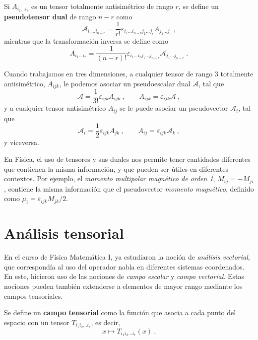 \begin{defi}
    Si $A_{i_1 \dots i_r}$ es un tensor totalmente antisimétrico de rango $r$, se define un \textbf{pseudotensor dual} de rango $n-r$ como
    \begin{equation}
        \mathcal{A}_{i_1 \dots i_{n-r}} = \frac{1}{r!} \varepsilon_{i_1 \dots i_{n-r} j_1 \dots j_r} A_{j_1 \dots j_r} \ ,
    \end{equation}
    mientras que la transformación inversa se define como
    \begin{equation}
        A_{i_1 \dots i_{r}} = \frac{1}{(n-r)!} \varepsilon_{i_1 \dots i_{r} j_1 \dots j_{n-r}} \mathcal{A}_{j_1 \dots j_{n-r}} \ .
    \end{equation}
\end{defi}

Cuando trabajamos en tres dimensiones, a cualquier tensor de rango 3 totalmente antisimétrico, $A_{ijk}$, le podemos asociar un pseudoescalar dual $\mathcal{A}$, tal que
\begin{equation}
    \mathcal{A} = \frac{1}{3!} \varepsilon_{ijk} A_{ijk} \ , \qquad A_{ijk} = \varepsilon_{ijk} \mathcal{A} \ ,
\end{equation}
y a cualquier tensor antisimétrico $A_{ij}$ se le puede asociar un pseudovector $\mathcal{A}_i$, tal que
\begin{equation}
    \mathcal{A}_i = \frac{1}{2} \varepsilon_{ijk} A_{jk} \ , \qquad A_{ij} = \varepsilon_{ijk} \mathcal{A}_k \ ,
\end{equation}
y viceversa.

En Física, el uso de tensores y sus duales nos permite tener cantidades diferentes que contienen la misma información, y que pueden ser útiles en diferentes contextos. Por ejemplo, el \emph{momento multipolar magnético de orden 1}, $M_{ij} = - M_{ji}$, contiene la misma información que el pseudovector \emph{momento magnético}, definido como $\mu_i = \varepsilon_{ijk} M_{jk}/2$.

\section{Análisis tensorial}

En el curso de Física Matemática I, ya estudiaron la noción de \emph{análisis vectorial}, que correspondía al uso del operador nabla en diferentes sistemas coordenados. En este, hicieron uso de las nociones de \emph{campo escalar} y \emph{campo vectorial}. Estas nociones pueden también extenderse a elementos de mayor rango mediante los campos tensoriales.
\begin{defi}
    Se define un \textbf{campo tensorial} como la función que asocia a cada punto del espacio con un tensor $T_{i_1 i_2 \dots i_r}$, es decir,
    \begin{equation}
        x \mapsto T_{i_1 i_2 \dots i_r}(x) \ .
    \end{equation}
\end{defi}

